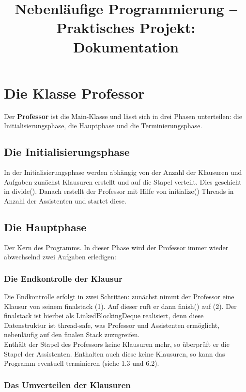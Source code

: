 \documentclass[12pt,a4paper]{article}
\title{Nebenläufige Programmierung – Praktisches Projekt:
Dokumentation}
\begin{document}
\maketitle

\tableofcontents

\newpage
\section{Die Klasse Professor}

Der \textbf{Professor} ist die Main-Klasse und lässt sich in drei Phasen unterteilen: die Initialisierungsphase, die Hauptphase und die Terminierungsphase.
\subsection{Die Initialisierungsphase}

In der Initialisierungsphase werden abhängig von der Anzahl der Klausuren und Aufgaben zunächst Klausuren erstellt und auf die Stapel verteilt. Dies geschieht in divide().  Danach erstellt der Professor mit Hilfe von initialize() Threads in Anzahl der Assistenten und startet diese.

\subsection{Die Hauptphase}
Der Kern des Programms. In dieser Phase wird der Professor immer wieder abwechselnd zwei Aufgaben erledigen: 

\subsubsection{Die Endkontrolle der Klausur}
Die Endkontrolle erfolgt in zwei Schritten: zunächst nimmt der Professor eine Klausur von seinem finalstack (1). Auf dieser ruft er dann finish() auf (2). Der finalstack ist hierbei als LinkedBlockingDeque realisiert, denn diese Datenstruktur ist thread-safe, was Professor und Assistenten ermöglicht, nebenläufig auf den finalen Stack zuzugreifen. \\
Enthält der Stapel des Professors keine Klausuren mehr, so überprüft er die Stapel der Assistenten. Enthalten auch diese keine Klausuren, so kann das Programm eventuell terminieren (siehe 1.3 und 6.2).

\subsubsection{Das Umverteilen der Klausuren}
\end{document}
